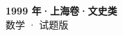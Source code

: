 \documentclass[zihao=-4, a4paper]{ctexart}
\begin{document}
\begin{center}
  {\Large\bfseries 1999 年·上海卷·文史类}\\[4pt]
  {\large 数学 · 试题版}
\end{center}
\medskip
{}

\end{document}
